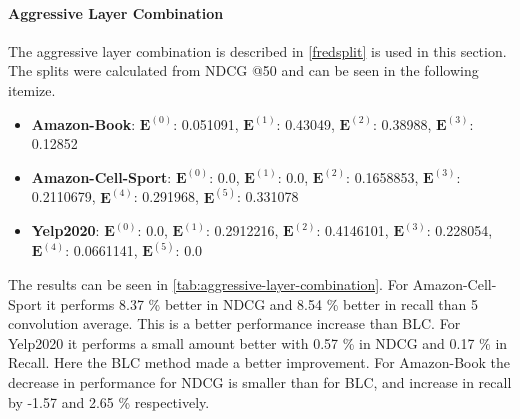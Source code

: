 \paragraph{Aggressive Layer Combination}
The aggressive layer combination is described in \autoref{fredsplit} is used in this section.
The splits were calculated from NDCG @50 and can be seen in the following itemize.
\begin{itemize}
    \item \textbf{Amazon-Book}: $\mathbf{E}^{(0)}$: 0.051091, $\mathbf{E}^{(1)}$: 0.43049, $\mathbf{E}^{(2)}$: 0.38988, $\mathbf{E}^{(3)}$:  0.12852
    \item \textbf{Amazon-Cell-Sport}: $\mathbf{E}^{(0)}$: 0.0, $\mathbf{E}^{(1)}$: 0.0, $\mathbf{E}^{(2)}$: 0.1658853, $\mathbf{E}^{(3)}$:  0.2110679, $\mathbf{E}^{(4)}$: 0.291968, $\mathbf{E}^{(5)}$: 0.331078
    \item \textbf{Yelp2020}: $\mathbf{E}^{(0)}$: 0.0, $\mathbf{E}^{(1)}$: 0.2912216, $\mathbf{E}^{(2)}$: 0.4146101, $\mathbf{E}^{(3)}$: 0.228054, $\mathbf{E}^{(4)}$: 0.0661141, $\mathbf{E}^{(5)}$: 0.0
\end{itemize}
The results can be seen in \autoref{tab:aggressive-layer-combination}.
For Amazon-Cell-Sport it performs 8.37 \% better in NDCG and 8.54 \% better in recall than 5 convolution average.
This is a better performance increase than BLC.
For Yelp2020 it performs a small amount better with 0.57 \% in NDCG and 0.17 \% in Recall.
Here the BLC method made a better improvement.
For Amazon-Book the decrease in performance for NDCG is smaller than for BLC, and increase in recall by -1.57 and 2.65 \% respectively.

